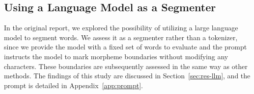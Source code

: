 \subsection{Using a Language Model as a Segmenter}\label{sec:llm}
In the original report, we explored the possibility of utilizing a large language model to segment words.
We assess it as a segmenter rather than a tokenizer, since we provide the model with a fixed set of words to evaluate and the prompt instructs the model to mark morpheme boundaries without modifying any characters.
These boundaries are subsequently assessed in the same way as other methods.
The findings of this study are discussed in Section~\ref{sec:res-llm}, and the prompt is detailed in Appendix~\ref{app:prompt}.

